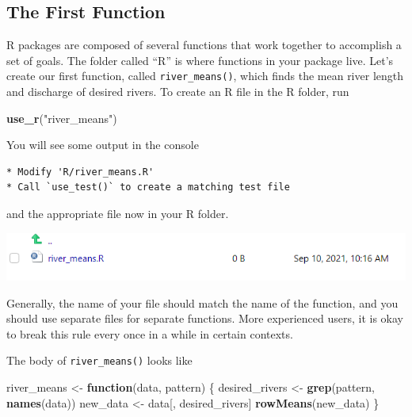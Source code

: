 \documentclass[
]{book}
\newenvironment{Shaded}{\begin{snugshade}}{\end{snugshade}}
\newcommand{\ControlFlowTok}[1]{\textcolor[rgb]{0.13,0.29,0.53}{\textbf{#1}}}
\newcommand{\KeywordTok}[1]{\textcolor[rgb]{0.13,0.29,0.53}{\textbf{#1}}}
\newcommand{\NormalTok}[1]{#1}
\newcommand{\StringTok}[1]{\textcolor[rgb]{0.31,0.60,0.02}{#1}}
\begin{document}
\hypertarget{first-function}{%
\subsection{The First Function}\label{first-function}}

R packages are composed of several functions that work together to accomplish a set of goals. The folder called ``R'' is where functions in your package live. Let's create our first function, called \texttt{river\_means()}, which finds the mean river length and discharge of desired rivers. To create an R file in the R folder, run

\begin{Shaded}
\begin{Highlighting}[]
\KeywordTok{use_r}\NormalTok{(}\StringTok{"river_means"}\NormalTok{)}
\end{Highlighting}
\end{Shaded}

You will see some output in the console

\begin{verbatim}
* Modify 'R/river_means.R'
* Call `use_test()` to create a matching test file 
\end{verbatim}

and the appropriate file now in your R folder.

\includegraphics[width=1\linewidth]{images/newrpack_function}

Generally, the name of your file should match the name of the function, and you should use separate files for separate functions. More experienced users, it is okay to break this rule every once in a while in certain contexts.

The body of \texttt{river\_means()} looks like

\begin{Shaded}
\begin{Highlighting}[]
\NormalTok{river_means <-}\StringTok{ }\ControlFlowTok{function}\NormalTok{(data, pattern) \{}
\NormalTok{  desired_rivers <-}\StringTok{ }\KeywordTok{grep}\NormalTok{(pattern, }\KeywordTok{names}\NormalTok{(data))}
\NormalTok{  new_data <-}\StringTok{ }\NormalTok{data[, desired_rivers]}
  \KeywordTok{rowMeans}\NormalTok{(new_data)}
\NormalTok{\}}
\end{Highlighting}
\end{Shaded}
\end{document}
